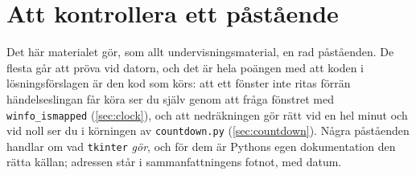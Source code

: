 \chapter{Att kontrollera ett påstående}
\label{app:verifiera-ovning-grafik}

Det här materialet gör, som allt undervisningsmaterial, en rad
påståenden.  De flesta går att pröva vid datorn, och det är hela poängen
med att koden i lösningsförslagen är den kod som körs: att ett fönster
inte ritas förrän händelseslingan får köra ser du själv genom att fråga
fönstret med \texttt{winfo_ismapped}
(\cref{sec:clock}), och att nedräkningen gör rätt vid en hel minut och
vid noll ser du i körningen av \texttt{countdown.py}
(\cref{sec:countdown}).  Några påståenden handlar om vad
\texttt{tkinter} \emph{gör}, och för dem är Pythons egen
dokumentation den rätta källan; adressen står i sammanfattningens fotnot,
med datum.

